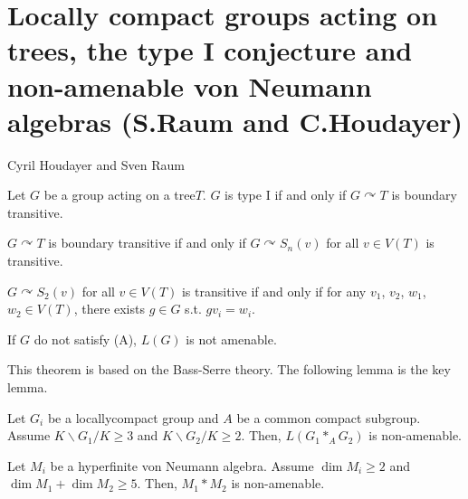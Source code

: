\section{Locally compact groups acting on trees, the type I conjecture and non-amenable von Neumann algebras (S.Raum and C.Houdayer)}
Cyril Houdayer and Sven Raum\cite{houdayer2016locally}
\begin{conjecture}
  Let $G$ be a group acting on a tree$T$.
  $G$ is type I if and only if $G \curvearrowright T$ is boundary transitive.
\end{conjecture}

\begin{remark}
  $G \curvearrowright T$ is boundary transitive if and only if $G  \curvearrowright S_n(v)$ for all $v \in V(T)$ is transitive.
\end{remark}

\begin{remark}[A]
  $G  \curvearrowright S_2(v)$ for all $v \in V(T)$ is transitive if and only if for any $v_1$, $v_2$, $w_1$, $w_2 \in V(T)$, there exists $g \in G$ s.t. $g v_i = w_i$.
\end{remark}

\begin{theorem}
  If $G$ do not satisfy (A), $L(G)$ is not amenable.
\end{theorem}
This theorem is based on the Bass-Serre theory.
The following lemma is the key lemma.
\begin{lemma}
  Let $G_i$ be a locallycompact group and $A$ be a common compact subgroup.
  Assume $K \backslash G_1 / K \geq 3$ and $K \backslash G_2 / K \geq 2$.
  Then, $L(G_1 *_A G_2)$ is non-amenable.
\end{lemma}

\begin{theorem}[Dykema]
  Let $M_i$ be a hyperfinite von Neumann algebra.
  Assume $\dim M_i \geq 2$ and $\dim M_1 + \dim M_2 \geq 5$.
  Then, $M_1 * M_2$ is non-amenable.
\end{theorem}



